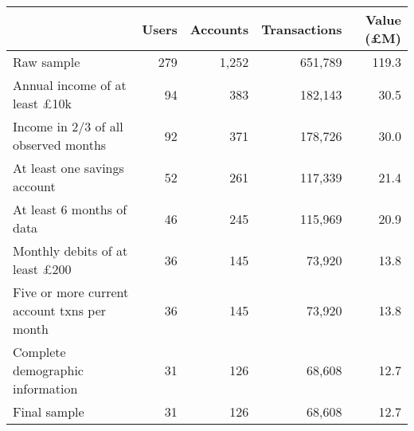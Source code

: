 \begin{tabular}{lrrrr}
\toprule
                                            & Users & Accounts & Transactions & Value (\pounds M) \\
\midrule
                                 Raw sample &   279 &    1,252 &      651,789 &             119.3 \\
       Annual income of at least \pounds10k &    94 &      383 &      182,143 &              30.5 \\
       Income in 2/3 of all observed months &    92 &      371 &      178,726 &              30.0 \\
               At least one savings account &    52 &      261 &      117,339 &              21.4 \\
                  At least 6 months of data &    46 &      245 &      115,969 &              20.9 \\
      Monthly debits of at least \pounds200 &    36 &      145 &       73,920 &              13.8 \\
Five or more current account txns per month &    36 &      145 &       73,920 &              13.8 \\
           Complete demographic information &    31 &      126 &       68,608 &              12.7 \\
                               Final sample &    31 &      126 &       68,608 &              12.7 \\
\bottomrule
\end{tabular}
